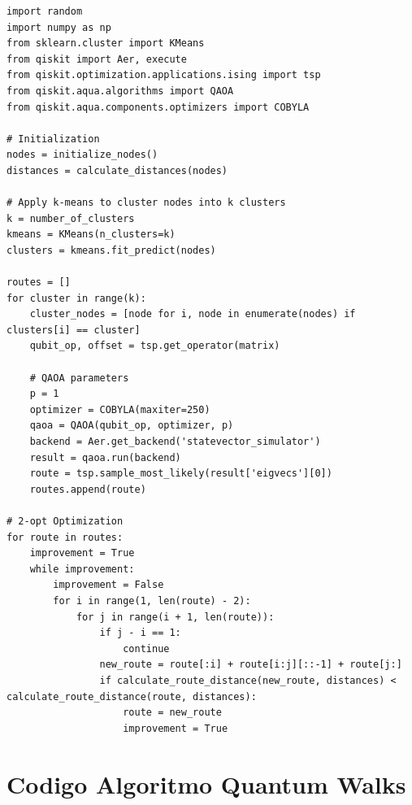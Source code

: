 \documentclass[11pt,a4paper,spanish]{book}
\begin{document}
\begin{lstlisting}
import random
import numpy as np
from sklearn.cluster import KMeans
from qiskit import Aer, execute
from qiskit.optimization.applications.ising import tsp
from qiskit.aqua.algorithms import QAOA
from qiskit.aqua.components.optimizers import COBYLA

# Initialization
nodes = initialize_nodes()
distances = calculate_distances(nodes)

# Apply k-means to cluster nodes into k clusters
k = number_of_clusters
kmeans = KMeans(n_clusters=k)
clusters = kmeans.fit_predict(nodes)

routes = []
for cluster in range(k):
    cluster_nodes = [node for i, node in enumerate(nodes) if clusters[i] == cluster]
    qubit_op, offset = tsp.get_operator(matrix)

    # QAOA parameters
    p = 1
    optimizer = COBYLA(maxiter=250)
    qaoa = QAOA(qubit_op, optimizer, p)
    backend = Aer.get_backend('statevector_simulator')
    result = qaoa.run(backend)
    route = tsp.sample_most_likely(result['eigvecs'][0])
    routes.append(route)

# 2-opt Optimization
for route in routes:
    improvement = True
    while improvement:
        improvement = False
        for i in range(1, len(route) - 2):
            for j in range(i + 1, len(route)):
                if j - i == 1:
                    continue
                new_route = route[:i] + route[i:j][::-1] + route[j:]
                if calculate_route_distance(new_route, distances) < calculate_route_distance(route, distances):
                    route = new_route
                    improvement = True
\end{lstlisting}



\section{Codigo Algoritmo Quantum Walks}
\end{document}
